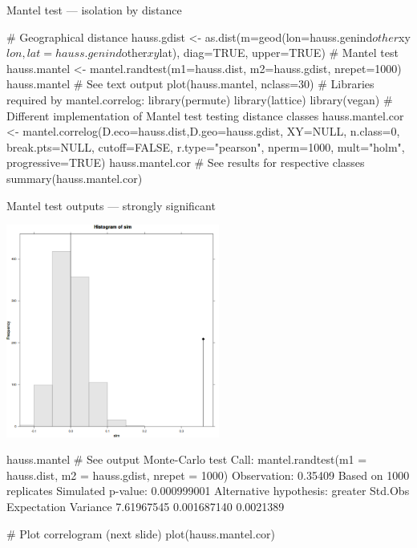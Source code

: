 \documentclass[compress, ucs, xelatex, 11pt, xcolor=svgnames, aspectratio=169,
	hyperref={
		bookmarks=true,
		unicode=true,
		colorlinks=true,
		pdftitle={Molecular data in R},
		plainpages=false,
		pdfauthor={Vojtech Zeisek},
		pdfsubject={Course about phylogeny and evolution in R},
		pdfcreator={XeLaTeX},
		pdfkeywords={R, evolution, phylogeny, molecular data},
		linkcolor=Crimson, %
		anchorcolor=Magenta, %
		citecolor=Magenta, %
		filecolor=Magenta, %
		menucolor=Magenta, %
		urlcolor=DodgerBlue, %
		pdftex},
	url={hyphens, lowtilde} %
	]{beamer}
\begin{document}
\begin{frame}[fragile]{Mantel test --- isolation by distance}
	\begin{spluscode}
    # Geographical distance
    hauss.gdist <- as.dist(m=geod(lon=hauss.genind$other$xy$lon,
      lat=hauss.genind$other$xy$lat), diag=TRUE, upper=TRUE)
    # Mantel test
    hauss.mantel <- mantel.randtest(m1=hauss.dist, m2=hauss.gdist, nrepet=1000)
    hauss.mantel # See text output
    plot(hauss.mantel, nclass=30)
    # Libraries required by mantel.correlog:
    library(permute)
    library(lattice)
    library(vegan)
    # Different implementation of Mantel test testing distance classes
    hauss.mantel.cor <- mantel.correlog(D.eco=hauss.dist,D.geo=hauss.gdist,
      XY=NULL, n.class=0, break.pts=NULL, cutoff=FALSE, r.type="pearson",
      nperm=1000, mult="holm", progressive=TRUE)
    hauss.mantel.cor # See results for respective classes
    summary(hauss.mantel.cor)
	\end{spluscode}
\end{frame}

\begin{frame}[fragile]{Mantel test outputs --- strongly significant}
	\begin{multicols}{2}
		\includegraphics[height=7cm]{mantel.png}
		\vfill
		\begin{spluscode}
    hauss.mantel # See output
    Monte-Carlo test
    Call: mantel.randtest(m1 =
      hauss.dist, m2 =
      hauss.gdist, nrepet = 1000)
    Observation: 0.35409
    Based on 1000 replicates
    Simulated p-value: 0.000999001
    Alternative hypothesis: greater
      Std.Obs Expectation  Variance
    7.61967545 0.001687140 0.0021389
		\end{spluscode}
		\vfill
		\begin{spluscode}
    # Plot correlogram (next slide)
    plot(hauss.mantel.cor)
		\end{spluscode}
		\vfill
	\end{multicols}
\end{frame}
\end{document}
